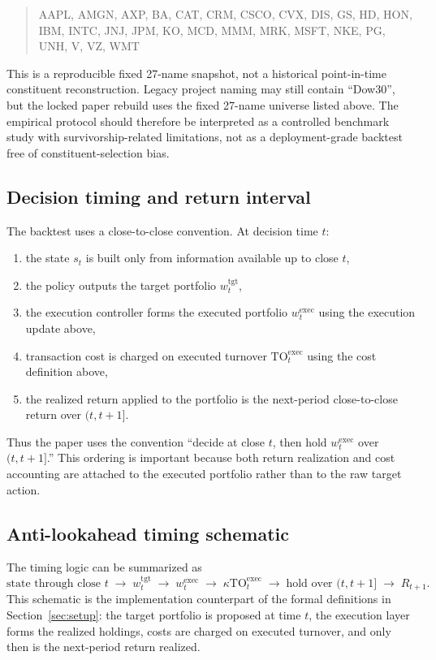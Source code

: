 \documentclass[10pt,twocolumn]{article}
\newcommand{\wexec}{w^{\mathrm{exec}}}
\newcommand{\wtgt}{w^{\mathrm{tgt}}}
\newcommand{\TOexec}{\mathrm{TO}^{\mathrm{exec}}}
\newcommand{\kappaTC}{\kappa}
\begin{document}
\begin{quote}
\small\ttfamily
AAPL, AMGN, AXP, BA, CAT, CRM, CSCO, CVX, DIS, GS, HD, HON, IBM, INTC, JNJ, JPM, KO, MCD, MMM, MRK, MSFT, NKE, PG, UNH, V, VZ, WMT
\end{quote}
This is a reproducible fixed 27-name snapshot, not a historical point-in-time constituent reconstruction. Legacy project naming may still contain ``Dow30'', but the locked paper rebuild uses the fixed 27-name universe listed above. The empirical protocol should therefore be interpreted as a controlled benchmark study with survivorship-related limitations, not as a deployment-grade backtest free of constituent-selection bias.

\subsection{Decision timing and return interval}
The backtest uses a close-to-close convention. At decision time $t$:
\begin{enumerate}[leftmargin=*,itemsep=1pt]
\item the state $s_t$ is built only from information available up to close $t$,
\item the policy outputs the target portfolio $\wtgt_t$,
\item the execution controller forms the executed portfolio $\wexec_t$ using the execution update above,
\item transaction cost is charged on executed turnover $\TOexec_t$ using the cost definition above,
\item the realized return applied to the portfolio is the next-period close-to-close return over $(t,t+1]$.
\end{enumerate}
Thus the paper uses the convention ``decide at close $t$, then hold $\wexec_t$ over $(t,t+1]$.'' This ordering is important because both return realization and cost accounting are attached to the executed portfolio rather than to the raw target action.

\subsection{Anti-lookahead timing schematic}
The timing logic can be summarized as
\[
\text{state through close } t
\;\rightarrow\;
\wtgt_t
\;\rightarrow\;
\wexec_t
\;\rightarrow\;
\kappaTC \TOexec_t
\;\rightarrow\;
\text{hold over }(t,t+1]
\;\rightarrow\;
R_{t+1}.
\]
This schematic is the implementation counterpart of the formal definitions in Section~\ref{sec:setup}: the target portfolio is proposed at time $t$, the execution layer forms the realized holdings, costs are charged on executed turnover, and only then is the next-period return realized.
\end{document}
